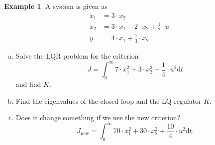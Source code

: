\documentclass[a4paper,12 pt]{article}
\numberwithin{equation}{section}
\theoremstyle{definition}
\newtheorem{bsp}{Example}
\theoremstyle{remark}
\theoremstyle{definition}
\theoremstyle{definition}
\theoremstyle{definition}
\theoremstyle{remark}
\begin{document}
\begin{bsp}
A system is given as
\begin{equation*}
\begin{split}
\dot{x}_1&=3\cdot x_2\\
\dot{x}_2&=3\cdot x_1-2\cdot x_2 + \frac{1}{2} \cdot u\\
y&=4\cdot x_1+\frac{7}{3} \cdot x_2.
\end{split}
\end{equation*}
\begin{enumerate}[(a)]
\item Solve the LQR problem for the criterion
\begin{equation*}
J=\int_0^\infty 7\cdot x_1^2+3\cdot x_2^2+\frac{1}{4}\cdot u^2 \text{d}t
\end{equation*}
and find $K$.
\item Find the eigenvalues of the closed-loop and the LQ regulator $K$.
\item Does it change something if we use the new criterion?
\begin{equation*}
J_{\text{new}}=\int_0^\infty 70\cdot x_1^2+30\cdot x_2^2+\frac{10}{4}\cdot u^2 \text{d}t.
\end{equation*}

\end{enumerate}



\end{bsp}
\end{document}
